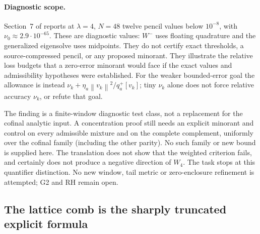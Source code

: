 \documentclass[11pt]{article}
\theoremstyle{remark}
\newcommand{\norm}[1]{\left\lVert #1\right\rVert}
\begin{document}
\paragraph{Diagnostic scope.}
Section~7 of  reports
at $\lambda=4$, $N=48$ twelve pencil values below $10^{-8}$, with
$\nu_0\approx2.9\cdot10^{-65}$. These are diagnostic values:
$W^-$ uses floating quadrature and the generalized eigensolve uses
midpoints. They do not certify exact thresholds, a source-compressed
pencil, or any proposed minorant. They illustrate the relative
loss budgets that a zero-error minorant would face if the exact
values and admissibility hypotheses were established.
For the weaker bounded-error goal the allowance is instead
$\nu_k+\eta_a\norm{v_k}^2/q_a^+[v_k]$; tiny $\nu_k$ alone does not
force relative accuracy $\nu_k$, or refute that goal.

The finding is a finite-window diagnostic test class, not a replacement
for the cofinal analytic input. A concentration proof still needs an
explicit minorant and control on every admissible mixture and on the
complete complement, uniformly over the cofinal family (including the
other parity). No such family or new bound is supplied here. The
translation does not show that the weighted criterion fails, and
certainly does not produce a negative direction of $W_4$. The task
stops at this quantifier distinction. No new window, tail metric or
zero-enclosure refinement is attempted; G2 and RH remain open.

\subsection*{The lattice comb is the sharply truncated explicit formula}
\end{document}
